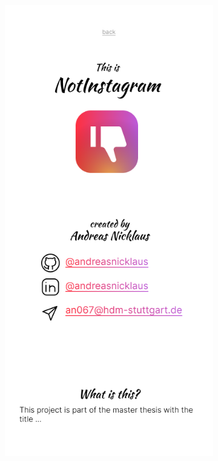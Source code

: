 \documentclass[a4paper, 12pt]{article}
\begin{document}
\begin{figure}[h]
  \begin{subfigure}{0.24\linewidth}
    \begin{center}
      \includegraphics[width=\linewidth, height=0.3\textheight, keepaspectratio,frame]{img/ig-clone/Informationsseite.png}

\end{center}
\end{subfigure}
\end{figure}
\end{document}
